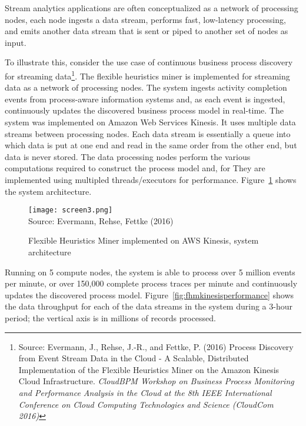 Stream analytics applications are often conceptualized as a network of processing nodes, each node ingests a data stream, performs fast, low-latency processing, and emits another data stream that is sent or piped to another set of nodes as input.

To illustrate this, consider the use case of continuous business process discovery for streaming data\footnote{Source: Evermann, J., Rehse, J.-R., and Fettke, P. (2016) Process Discovery from Event Stream Data in the Cloud - A Scalable, Distributed Implementation of the Flexible Heuristics Miner on the Amazon Kinesis Cloud Infrastructure. \emph{CloudBPM Workshop on Business Process Monitoring and Performance Analysis in the Cloud at the 8th IEEE International Conference on Cloud Computing Technologies and Science (CloudCom 2016)}}. The flexible heuristics miner is implemented for streaming data as a network of processing nodes. The system ingests activity completion events from process-aware information systems and, as each event is ingested, continuously updates the discovered business process model in real-time. The system was implemented on Amazon Web Services Kinesis. It uses multiple data streams between processing nodes. Each data stream is essentially a queue into which data is put at one end and read in the same order from the other end, but data is never stored. The data processing nodes perform the various computations required to construct the process model and, for  They are implemented using multipled threads/executors for performance. Figure~\ref{fig:fhmkinesis} shows the system architecture. 

\begin{figure}
\centering

\texttt{[image: screen3.png]} \\

\scriptsize Source: Evermann, Rehse, Fettke (2016)\normalsize
\caption[FHM on AWS Kinesis -- system architecture]{Flexible Heuristics Miner implemented on AWS Kinesis, system architecture}
\label{fig:fhmkinesis}
\end{figure}

Running on 5 compute nodes, the system is able to process over 5 million events per minute, or over 150,000 complete process traces per minute and continuously updates the discovered process model. Figure~\ref{fig:fhmkinesisperformance} shows the data throughput for each of the data streams in the system during a 3-hour period; the vertical axis is in millions of records processed.

